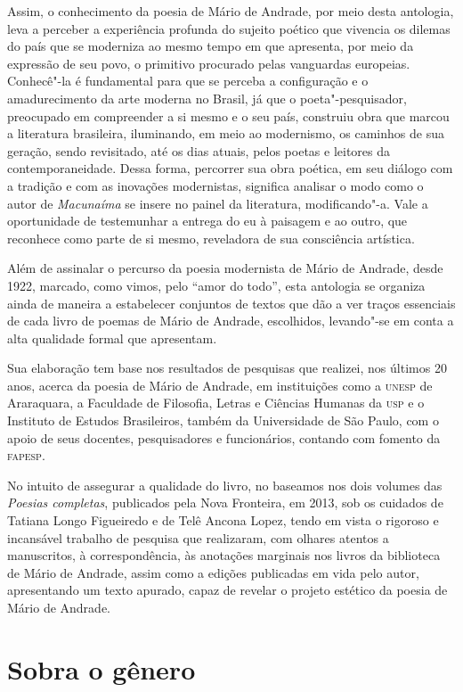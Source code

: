 Assim, o conhecimento da poesia de Mário de Andrade, por meio desta
antologia, leva a perceber a experiência profunda do sujeito poético que
vivencia os dilemas do país que se moderniza ao mesmo tempo em que
apresenta, por meio da expressão de seu povo, o primitivo procurado
pelas vanguardas europeias. Conhecê"-la é fundamental para que se perceba
a configuração e o amadurecimento da arte moderna no Brasil, já que o
poeta"-pesquisador, preocupado em compreender a si mesmo e o seu país,
construiu obra que marcou a literatura brasileira, iluminando, em meio
ao modernismo, os caminhos de sua geração, sendo revisitado, até os dias
atuais, pelos poetas e leitores da contemporaneidade. Dessa forma,
percorrer sua obra poética, em seu diálogo com a tradição e com as
inovações modernistas, significa analisar o modo como o autor de
\emph{Macunaíma} se insere no painel da literatura, modificando"-a. Vale
a oportunidade de testemunhar a entrega do eu à paisagem e ao outro, que
reconhece como parte de si mesmo, reveladora de sua consciência
artística.


Além de assinalar o percurso da poesia modernista de Mário de Andrade,
desde 1922, marcado, como vimos, pelo ``amor do todo'', esta antologia
se organiza ainda de maneira a estabelecer conjuntos de textos que dão a
ver traços essenciais de cada livro de poemas de Mário de Andrade,
escolhidos, levando"-se em conta a alta qualidade formal que apresentam.

Sua elaboração tem base nos resultados de pesquisas que realizei, nos
últimos 20 anos, acerca da poesia de Mário de Andrade, em instituições
como a \textsc{unesp} de Araraquara, a Faculdade de Filosofia, Letras e Ciências
Humanas da \textsc{usp} e o Instituto de Estudos Brasileiros, também da
Universidade de São Paulo, com o apoio de seus docentes, pesquisadores e
funcionários, contando com fomento da \textsc{fapesp}.

No intuito de assegurar a qualidade do livro, no baseamos nos dois
volumes das \emph{Poesias completas}, publicados pela Nova Fronteira, em
2013, sob os cuidados de Tatiana Longo Figueiredo e de Telê Ancona
Lopez, tendo em vista o rigoroso e incansável trabalho de pesquisa que
realizaram, com olhares atentos a manuscritos, à correspondência, às
anotações marginais nos livros da biblioteca de Mário de Andrade, assim
como a edições publicadas em vida pelo autor, apresentando um texto
apurado, capaz de revelar o projeto estético da poesia de Mário de
Andrade.

\section{Sobra o gênero}
